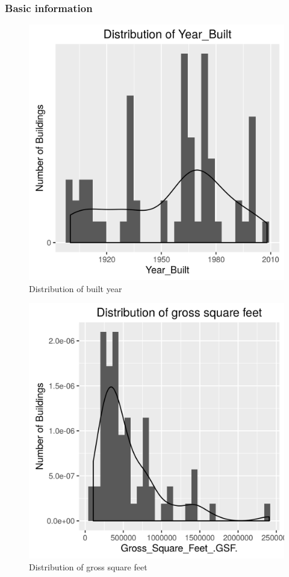 \documentclass[12pt]{article}
\begin{document}
\subsubsection{Basic information}
\begin{figure}[h!]
  \centering
  \includegraphics{images/dist_year_built.png}
  \caption{Distribution of built year}
  \label{fig:dist_year_built}
\end{figure}
\FloatBarrier
\begin{figure}[h!]
  \centering
  \includegraphics{images/dist_gsf.png}
  \caption{Distribution of gross square feet}
  \label{fig:dist_gsf}
\end{figure}
\end{document}
